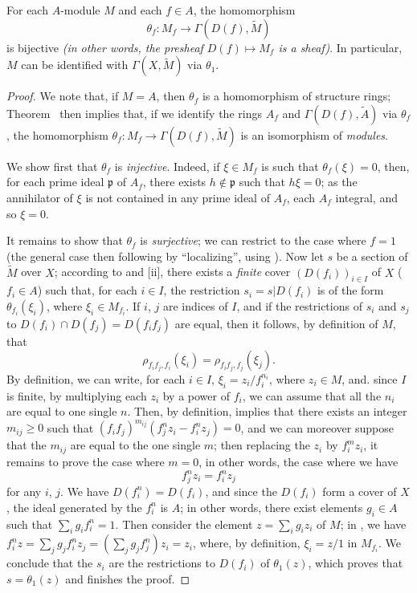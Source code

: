 \begin{theorem}[1.3.7]
\label{I.1.3.7}
For each $A$-module $M$ and each $f\in A$, the homomorphism
\[
  \theta_f:M_f\to\Gamma(D(f),\widetilde{M})
\]
is bijective \emph{(in other words, the presheaf $D(f)\mapsto M_f$ is a \emph{sheaf})}.
In particular, $M$ can be identified with $\Gamma(X,\widetilde{M})$ via $\theta_1$.
\end{theorem}

\begin{proof}
\label{proof-I.1.3.7}
We note that, if $M=A$, then $\theta_f$ is a homomorphism of structure rings;
Theorem~ then implies that, if we identify the rings $A_f$ and $\Gamma(D(f),\widetilde{A})$ via $\theta_f$, the homomorphism $\theta_f:M_f\to\Gamma(D(f),\widetilde{M})$ is an isomorphism of \emph{modules}.

We show first that $\theta_f$ is \emph{injective}.
Indeed, if $\xi\in M_f$ is such that $\theta_f(\xi)=0$, then, for each prime ideal $\mathfrak{p}$ of $A_f$, there exists $h\not\in\mathfrak{p}$ such that $h\xi=0$;
as the annihilator of $\xi$ is not contained in any prime ideal of $A_f$, each $A_f$ integral, and so $\xi=0$.

It remains to show that $\theta_f$ is \emph{surjective};
we can restrict to the case where $f=1$ (the general case then following by ``localizing'', using ).
Now let $s$ be a section of $\widetilde{M}$ over $X$;
according to  and [ii], there exists a \emph{finite} cover $(D(f_i))_{i\in I}$ of $X$ ($f_i\in A$) such that, for each $i\in I$, the restriction $s_i=s|D(f_i)$ is of the form $\theta_{f_i}(\xi_i)$, where $\xi_i\in M_{f_i}$.
If $i$, $j$ are indices of $I$, and if the restrictions of $s_i$ and $s_j$ to $D(f_i)\cap D(f_j)=D(f_i f_j)$ are equal, then it follows, by definition of $M$, that
\[
  \label{I.1.3.7.1}
  \rho_{f_i f_j,f_i}(\xi_i)=\rho_{f_i f_j,f_j}(\xi_j).
  \tag{1.3.7.1}
\]
By definition, we can write, for each $i\in I$, $\xi_i=z_i/f_i^{n_i}$, where $z_i\in M$, and. since $I$ is finite, by multiplying each $z_i$ by a power of $f_i$, we can assume that all the $n_i$ are equal to one single $n$.
Then, by definition,  implies that there exists an integer $m_{ij}\geq 0$ such that $(f_i f_j)^{m_{ij}}(f_j^n z_i-f_i^n z_j)=0$, and we can moreover suppose that the $m_{ij}$ are equal to the one single $m$;
then replacing the $z_i$ by $f_i^m z_i$, it remains to prove the case where $m=0$, in other words, the case where we have
\[
  \label{I.1.3.7.2}
  f_j^n z_i=f_i^n z_j
  \tag{1.3.7.2}
\]
for any $i$, $j$.
We have $D(f_i^n)=D(f_i)$, and since the $D(f_i)$ form a cover of $X$, the ideal generated by the $f_i^n$ is $A$;
in other words, there exist elements $g_i\in A$ such that $\sum_i g_i f_i^n=1$.
Then consider the element $z=\sum_i g_i z_i$ of $M$;
in , we have $f_i^n z=\sum_j g_j f_i^n z_j=(\sum_j g_j f_j^n)z_i=z_i$, where, by definition, $\xi_i=z/1$ in $M_{f_i}$.
We conclude
that the $s_i$ are the restrictions to $D(f_i)$ of $\theta_1(z)$, which proves that $s=\theta_1(z)$ and finishes the proof.
\end{proof}

